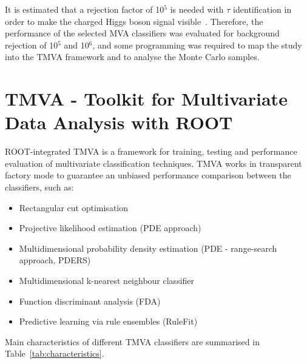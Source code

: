\documentclass[a4paper]{jpconf}
\begin{document}
It is estimated that a rejection factor of 10$^{5}$ is needed with
$\tau$ identification in order to make the charged Higgs boson signal
visible~\cite{ptdrII}. Therefore, the performance of the selected MVA
classifiers was evaluated for background rejection of 10$^{5}$ and 10$^{6}$,
and some programming was required to map the study into the TMVA framework 
and to analyse the Monte Carlo samples.


\section{TMVA - Toolkit for Multivariate Data Analysis with ROOT}\label{sec:tmva}

ROOT-integrated TMVA is a framework for training, testing and performance evaluation
of multivariate classification techniques.
TMVA works in transparent factory mode 
to guarantee an unbiased performance comparison between the classifiers, such as:

\begin{itemize}
\item Rectangular cut optimisation
\item Projective likelihood estimation (PDE approach)
\item Multidimensional probability density estimation (PDE - range-search approach, PDERS)
\item Multidimensional k-nearest neighbour classifier
\item Function discriminant analysis (FDA)
\item Predictive learning via rule ensembles (RuleFit)
\end{itemize}
 
Main characteristics of different TMVA classifiers are summarised in Table~\ref{tab:characteristics}.
\end{document}
